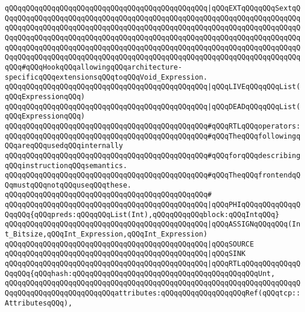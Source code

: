 \verb|qQQqqQQqqQQqqQQqqQQqqQQqqQQqqQQqqQQqqQQqqQQqqQQq|\verb#|qQQqEXTqQQqqQQqSextqQQqqQQqqQQqqQQqqQQqqQQqqQQqqQQqqQQqqQQqqQQqqQQqqQQqqQQqqQQqqQQqqQQqqQQqqQQqqQQqqQQqqQQqqQQqqQQqqQQqqQQqqQQqqQQqqQQqqQQqqQQqqQQqqQQqqQQqqQQqqQQqqQQqqQQqqQQqqQQqqQQqqQQqqQQqqQQqqQQqqQQqqQQqqQQqqQQqqQQqqQQqqQQqqQQqqQQqqQQqqQQqqQQqqQQqqQQqqQQqqQQqqQQqqQQqqQQqqQQqqQQqqQQqqQQqqQQqqQQqqQQqqQQqqQQqqQQqqQQqqQQqqQQqqQQqqQQqqQQqqQQqqQQqqQQqqQQqqQQqqQQqqQQqqQQqqQQq#\verb|#qQQqHookqQQqallowingqQQqarchitecture-specificqQQqextensionsqQQqtoqQQqVoid_Expression.|\newline
\newline
\verb|qQQqqQQqqQQqqQQqqQQqqQQqqQQqqQQqqQQqqQQqqQQqqQQq|\verb#|qQQqLIVEqQQqqQQqList(qQQqExpressionqQQq)#\newline
\verb|qQQqqQQqqQQqqQQqqQQqqQQqqQQqqQQqqQQqqQQqqQQqqQQq|\verb#|qQQqDEADqQQqqQQqList(qQQqExpressionqQQq)#\newline
\newline
\verb|qQQqqQQqqQQqqQQqqQQqqQQqqQQqqQQqqQQqqQQqqQQqqQQq#qQQqRTLqQQqoperators:|\newline
\verb|qQQqqQQqqQQqqQQqqQQqqQQqqQQqqQQqqQQqqQQqqQQqqQQq#qQQqTheqQQqfollowingqQQqareqQQqusedqQQqinternally|\newline
\verb|qQQqqQQqqQQqqQQqqQQqqQQqqQQqqQQqqQQqqQQqqQQqqQQq#qQQqforqQQqdescribingqQQqinstructionqQQqsemantics.|\newline
\verb|qQQqqQQqqQQqqQQqqQQqqQQqqQQqqQQqqQQqqQQqqQQqqQQq#qQQqTheqQQqfrontendqQQqmustqQQqnotqQQquseqQQqthese.|\newline
\verb|qQQqqQQqqQQqqQQqqQQqqQQqqQQqqQQqqQQqqQQqqQQqqQQq#|\newline
\verb|qQQqqQQqqQQqqQQqqQQqqQQqqQQqqQQqqQQqqQQqqQQqqQQq|\verb#|qQQqPHIqQQqqQQqqQQqqQQqqQQq{qQQqpreds:qQQqqQQqList(Int),qQQqqQQqqQQqblock:qQQqIntqQQq}#\newline
\verb|qQQqqQQqqQQqqQQqqQQqqQQqqQQqqQQqqQQqqQQqqQQqqQQq|\verb#|qQQqASSIGNqQQqqQQq(Int_Bitsize,qQQqInt_Expression,qQQqInt_Expression)#\newline
\verb|qQQqqQQqqQQqqQQqqQQqqQQqqQQqqQQqqQQqqQQqqQQqqQQq|\verb#|qQQqSOURCE#\newline
\verb|qQQqqQQqqQQqqQQqqQQqqQQqqQQqqQQqqQQqqQQqqQQqqQQq|\verb#|qQQqSINK#\newline
\verb|qQQqqQQqqQQqqQQqqQQqqQQqqQQqqQQqqQQqqQQqqQQqqQQq|\verb#|qQQqRTLqQQqqQQqqQQqqQQqqQQq{qQQqhash:qQQqqQQqqQQqqQQqqQQqqQQqqQQqqQQqqQQqqQQqqQQqUnt,#\newline
\verb|qQQqqQQqqQQqqQQqqQQqqQQqqQQqqQQqqQQqqQQqqQQqqQQqqQQqqQQqqQQqqQQqqQQqqQQqqQQqqQQqqQQqqQQqqQQqqQQqattributes:qQQqqQQqqQQqqQQqqQQqRef(qQQqtcp::AttributesqQQq),|\newline
